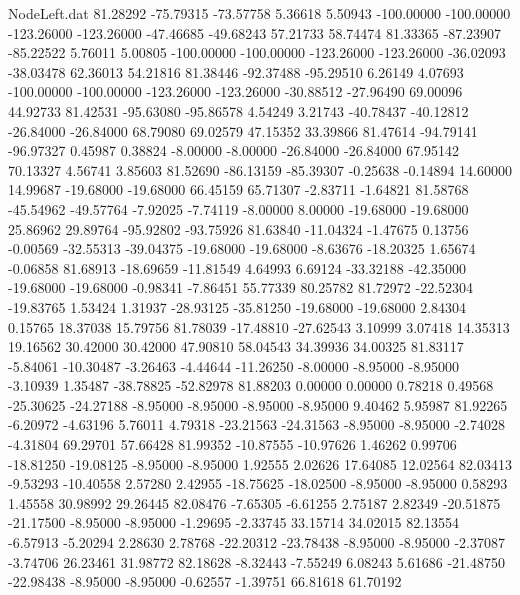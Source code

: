 \begin{filecontents}{NodeLeft.dat}
  81.28292  -75.79315  -73.57758     5.36618    5.50943 -100.00000 -100.00000 -123.26000 -123.26000  -47.46685  -49.68243   57.21733   58.74474
  81.33365  -87.23907  -85.22522     5.76011    5.00805 -100.00000 -100.00000 -123.26000 -123.26000  -36.02093  -38.03478   62.36013   54.21816
  81.38446  -92.37488  -95.29510     6.26149    4.07693 -100.00000 -100.00000 -123.26000 -123.26000  -30.88512  -27.96490   69.00096   44.92733
  81.42531  -95.63080  -95.86578     4.54249    3.21743  -40.78437  -40.12812  -26.84000  -26.84000   68.79080   69.02579   47.15352   33.39866
  81.47614  -94.79141  -96.97327     0.45987    0.38824   -8.00000   -8.00000  -26.84000  -26.84000   67.95142   70.13327    4.56741    3.85603
  81.52690  -86.13159  -85.39307    -0.25638   -0.14894   14.60000   14.99687  -19.68000  -19.68000   66.45159   65.71307   -2.83711   -1.64821
  81.58768  -45.54962  -49.57764    -7.92025   -7.74119   -8.00000    8.00000  -19.68000  -19.68000   25.86962   29.89764  -95.92802  -93.75926
  81.63840  -11.04324   -1.47675     0.13756   -0.00569  -32.55313  -39.04375  -19.68000  -19.68000   -8.63676  -18.20325    1.65674   -0.06858
  81.68913  -18.69659  -11.81549     4.64993    6.69124  -33.32188  -42.35000  -19.68000  -19.68000   -0.98341   -7.86451   55.77339   80.25782
  81.72972  -22.52304  -19.83765     1.53424    1.31937  -28.93125  -35.81250  -19.68000  -19.68000    2.84304    0.15765   18.37038   15.79756
  81.78039  -17.48810  -27.62543     3.10999    3.07418   14.35313   19.16562   30.42000   30.42000   47.90810   58.04543   34.39936   34.00325
  81.83117   -5.84061  -10.30487    -3.26463   -4.44644  -11.26250   -8.00000   -8.95000   -8.95000   -3.10939    1.35487  -38.78825  -52.82978
  81.88203    0.00000    0.00000     0.78218    0.49568  -25.30625  -24.27188   -8.95000   -8.95000   -8.95000   -8.95000    9.40462    5.95987
  81.92265   -6.20972   -4.63196     5.76011    4.79318  -23.21563  -24.31563   -8.95000   -8.95000   -2.74028   -4.31804   69.29701   57.66428
  81.99352  -10.87555  -10.97626     1.46262    0.99706  -18.81250  -19.08125   -8.95000   -8.95000    1.92555    2.02626   17.64085   12.02564
  82.03413   -9.53293  -10.40558     2.57280    2.42955  -18.75625  -18.02500   -8.95000   -8.95000    0.58293    1.45558   30.98992   29.26445
  82.08476   -7.65305   -6.61255     2.75187    2.82349  -20.51875  -21.17500   -8.95000   -8.95000   -1.29695   -2.33745   33.15714   34.02015
  82.13554   -6.57913   -5.20294     2.28630    2.78768  -22.20312  -23.78438   -8.95000   -8.95000   -2.37087   -3.74706   26.23461   31.98772
  82.18628   -8.32443   -7.55249     6.08243    5.61686  -21.48750  -22.98438   -8.95000   -8.95000   -0.62557   -1.39751   66.81618   61.70192

\end{filecontents}
